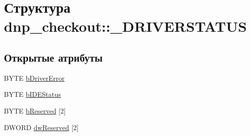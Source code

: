 \hypertarget{structdnp__checkout_1_1___d_r_i_v_e_r_s_t_a_t_u_s}{\section{Структура dnp\-\_\-checkout\-:\-:\-\_\-\-D\-R\-I\-V\-E\-R\-S\-T\-A\-T\-U\-S}
\label{structdnp__checkout_1_1___d_r_i_v_e_r_s_t_a_t_u_s}
}
\subsection*{Открытые атрибуты}
\begin{DoxyCompactItemize}
\item 
B\-Y\-T\-E \hyperlink{structdnp__checkout_1_1___d_r_i_v_e_r_s_t_a_t_u_s_adbcbdc4a05a3e0ebb46dd8c78b4b4358}{b\-Driver\-Error}
\item 
B\-Y\-T\-E \hyperlink{structdnp__checkout_1_1___d_r_i_v_e_r_s_t_a_t_u_s_a18b2acc1c5567dfffba4226b2f45b5f7}{b\-I\-D\-E\-Status}
\item 
B\-Y\-T\-E \hyperlink{structdnp__checkout_1_1___d_r_i_v_e_r_s_t_a_t_u_s_a262b11824fb765575bbea583786db54d}{b\-Reserved} \mbox{[}2\mbox{]}
\item 
D\-W\-O\-R\-D \hyperlink{structdnp__checkout_1_1___d_r_i_v_e_r_s_t_a_t_u_s_ab4b0e086ec85c03b0cbb36349b7bcc06}{dw\-Reserved} \mbox{[}2\mbox{]}
\end{DoxyCompactItemize}


